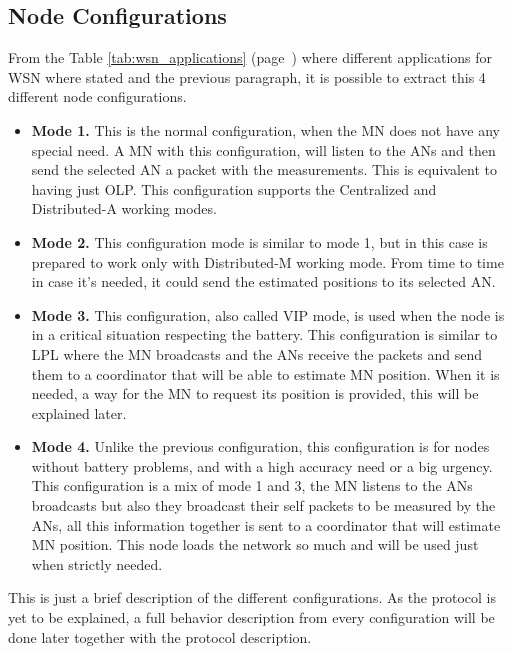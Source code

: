 \subsection{Node Configurations}

From the Table \ref{tab:wsn_applications} (page~\pageref{tab:wsn_applications}) where different applications for \ac{WSN} where stated and the
previous paragraph, it is possible to extract this 4 different node configurations.

\begin{itemize}
 \item \textbf{Mode 1.} This is the normal configuration, when the \ac{MN} does not have any special need. A \ac{MN} with this configuration,
will listen to the \acp{AN} and then send the selected \ac{AN} a packet with the measurements. This is equivalent to having just \ac{OLP}. This
configuration supports the Centralized and Distributed-A working modes.
 \item \textbf{Mode 2.} This configuration mode is similar to mode 1, but in this case is prepared to work only with Distributed-M working mode.
From time to time in case it's needed, it could send the estimated positions to its selected \ac{AN}.
 \item \textbf{Mode 3.} This configuration, also called \ac{VIP} mode, is used when the node is in a critical situation respecting the battery.
This configuration is similar to \ac{LPL} where the \ac{MN} broadcasts and the \acp{AN} receive the packets and send them to a coordinator that
will be able to estimate \ac{MN} position. When it is needed, a way for the \ac{MN} to request its position is provided, this will be explained 
later. 
 \item \textbf{Mode 4.} Unlike the previous configuration, this configuration is for nodes without battery problems, and with a high accuracy
need or a big urgency. This configuration is a mix of mode 1 and 3, the \ac{MN} listens to the \acp{AN} broadcasts but also they broadcast their
self packets to be measured by the \acp{AN}, all this information together is sent to a coordinator that will estimate \ac{MN} position.
This node loads the network so much and will be used just when strictly needed.
\end{itemize}

This is just a brief description of the different configurations. As the protocol is yet to be explained, a full behavior description from 
every configuration will be done later together with the protocol description.

